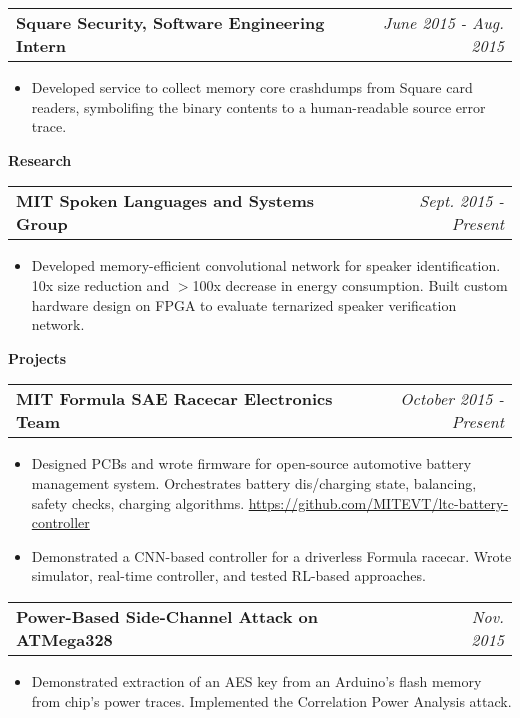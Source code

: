 \documentclass[letterpaper,11pt]{article}
\makeatletter
\newcommand{\resitem}[1]{\item[--] #1 \vspace{-4pt}}
\newcommand{\ressubheadingtwo}[2] {
\begin{tabular*}{7in}{l@{\extracolsep{\fill}}r}
	\textbf{#1} & \textit{#2} \\
\end{tabular*}\vspace{-6pt}}
\makeatother
\begin{document}
    \vspace{0.05in}
	\ressubheadingtwo{Square Security, Software Engineering Intern}{June 2015 - Aug. 2015}
	\begin{itemize}
            \resitem{Developed service to collect memory core crashdumps from Square card readers, symbolifing the binary contents to a human-readable source error trace.}
	\end{itemize}

    \vspace{0.05in}

\large \textbf{Research \vspace{1mm}} \normalsize
    \vspace{0.05in}

	\ressubheadingtwo{MIT Spoken Languages and Systems Group}{Sept. 2015 - Present}{}
	\begin{itemize}
            \resitem{Developed memory-efficient convolutional network for speaker identification. 10x size reduction and $>$100x decrease in energy consumption. Built custom hardware design on FPGA to evaluate ternarized speaker verification network.}
	\end{itemize}

\large \textbf{Projects\vspace{1mm}} \normalsize

    \ressubheadingtwo{MIT Formula SAE Racecar Electronics Team}{October 2015 - Present}
    \begin{itemize}
        \resitem{Designed PCBs and wrote firmware for open-source automotive battery management system. Orchestrates battery dis/charging state, balancing, safety checks, charging algorithms. \url{https://github.com/MITEVT/ltc-battery-controller}}
            \resitem{Demonstrated a CNN-based controller for a driverless Formula racecar. Wrote simulator, real-time controller, and tested RL-based approaches. }
    \end{itemize}

    \ressubheadingtwo{Power-Based Side-Channel Attack on ATMega328}{Nov. 2015}{}
	\begin{itemize}
            \resitem{Demonstrated extraction of an AES key from an Arduino's flash memory from chip's power traces. Implemented the Correlation Power Analysis attack. }
	\end{itemize}

    \vspace{0.05in}
\end{document}
